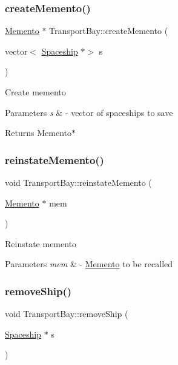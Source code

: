 \subsubsection{\texorpdfstring{create\+Memento()}{createMemento()}}
{\footnotesize\ttfamily \hyperlink{classMemento}{Memento} $\ast$ Transport\+Bay\+::create\+Memento (\begin{DoxyParamCaption}\item[{vector$<$ \hyperlink{classSpaceship}{Spaceship} $\ast$$>$}]{s }\end{DoxyParamCaption})}

Create memento 
\begin{DoxyParams}{Parameters}
{\em s} & -\/ vector of spaceships to save \\
\hline
\end{DoxyParams}
\begin{DoxyReturn}{Returns}
Memento$\ast$ 
\end{DoxyReturn}
\mbox{\label{classTransportBay_a501256401b6845a16ced9ea65c294f70}} 
\subsubsection{\texorpdfstring{reinstate\+Memento()}{reinstateMemento()}}
{\footnotesize\ttfamily void Transport\+Bay\+::reinstate\+Memento (\begin{DoxyParamCaption}\item[{\hyperlink{classMemento}{Memento} $\ast$}]{mem }\end{DoxyParamCaption})}

Reinstate memento 
\begin{DoxyParams}{Parameters}
{\em mem} & -\/ \hyperlink{classMemento}{Memento} to be recalled \\
\hline
\end{DoxyParams}
\mbox{\label{classTransportBay_a053ab5bbf5b6cafe1f5b3782176bd214}} 
\subsubsection{\texorpdfstring{remove\+Ship()}{removeShip()}}
{\footnotesize\ttfamily void Transport\+Bay\+::remove\+Ship (\begin{DoxyParamCaption}\item[{\hyperlink{classSpaceship}{Spaceship} $\ast$}]{s }\end{DoxyParamCaption})}

